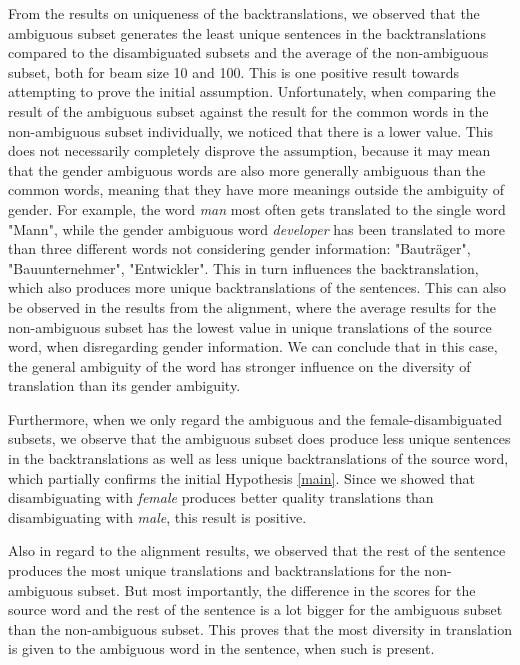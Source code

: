 From the results on uniqueness of the backtranslations, we observed that the ambiguous subset generates the least unique sentences in the backtranslations compared to the disambiguated subsets and the average of the non-ambiguous subset, both for beam size 10 and 100. This is one positive result towards attempting to prove the initial assumption. Unfortunately, when comparing the result of the ambiguous subset against the result for the common words in the non-ambiguous subset individually, we noticed that there is a lower value. This does not necessarily completely disprove the assumption, because it may mean that the gender ambiguous words are also more generally ambiguous than the common words, meaning that they have more meanings outside the ambiguity of gender. For example, the word \textit{man} most often gets translated to the single word "Mann", while the gender ambiguous word \textit{developer} has been translated to more than three different words not considering gender information: "Bauträger", "Bauunternehmer", "Entwickler". This in turn influences the backtranslation, which also produces more unique backtranslations of the sentences. This can also be observed in the results from the alignment, where the average results for the non-ambiguous subset has the lowest value in unique translations of the source word, when disregarding gender information.  We can conclude that in this case, the general ambiguity of the word has stronger influence on the diversity of translation than its gender ambiguity.

Furthermore, when we only regard the ambiguous and the female-disambiguated subsets, we observe that the ambiguous subset does produce less unique sentences in the backtranslations as well as less unique backtranslations of the source word, which partially confirms the initial Hypothesis \ref{main}. Since we showed that disambiguating with \textit{female} produces better quality translations than disambiguating with \textit{male}, this result is positive.

Also in regard to the alignment results, we observed that the rest of the sentence produces the most unique translations and backtranslations for the non-ambiguous subset. But most importantly, the difference in the scores for the source word and the rest of the sentence is a lot bigger for the ambiguous subset than the non-ambiguous subset. This proves that the most diversity in translation is given to the ambiguous word in the sentence, when such is present.


